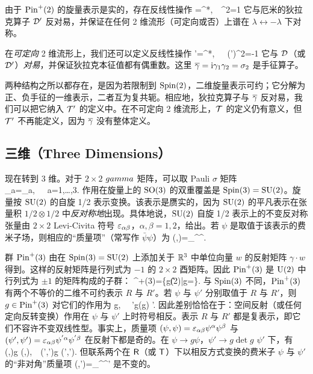由于 ${\mathrm{Pin}}^+(2)$ 的旋量表示是实的，存在反线性操作
\be\label{wes}\T\psi =\psi^*,~~\T^2=1 \ee
它与厄米的狄拉克算子 ${\mathcal D}'$ 反对易，并保证在任何 2 维流形（可定向或否）上谱在 $\lambda\leftrightarrow -\lambda$ 下对称。

在{\it 可定向} 2 维流形上，我们还可以定义反线性操作
\be\label{res}\T'\psi=\bg \psi^*,~~~(\T')^2=-1 \ee
它与 ${\mathcal D}$（或 ${\mathcal D}'$）{\it 对易}，并保证狄拉克本征值都有偶重数。这里 ${\overline\gamma}={\mathrm i}{\gamma}_1{\gamma}_2=\sigma_2$ 是手征算子。


两种结构之所以都存在，是因为若限制到 ${\mathrm{Spin}}(2)$，二维旋量表示可约；它分解为正、负手征的一维表示，二者互为复共轭。相应地，狄拉克算子与 ${\overline\gamma}$ 反对易，我们可以把它纳入 ${\mathcal T}'$ 的定义中。在不可定向 2 维流形上，${\mathcal T}$ 的定义仍有意义，但 ${\mathcal T}'$ 不再能定义，因为 ${\overline\gamma}$ 没有整体定义。

\subsection{三维（Three Dimensions）}\label{wwod}

现在转到 3 维。对于 $2\times 2$ $\\gamma$ 矩阵，可以取 Pauli $\sigma$ 矩阵
\be\label{zob} \g_a=\sigma_a,~~~a=1,\dots,3.\ee
作用在旋量上的 ${\mathrm{SO}}(3)$ 的双重覆盖是 ${\mathrm{Spin}}(3)={\mathrm{SU}}(2)$。旋量按 ${\mathrm{SU}}(2)$ 的自旋 1/2 表示变换。该表示是赝实的，因为 ${\mathrm{SU}}(2)$ 的平凡表示在张量积 $1/2\otimes 1/2$ 中{\it 反对称地}出现。具体地说，${\mathrm{SU}}(2)$ 自旋 1/2 表示上的不变反对称张量由 $2\times 2$ Levi-Civita 符号 $\varepsilon_{\alpha \beta}$，$\alpha,\beta=1,2$，给出。若 $\psi$ 是取值于该表示的费米子场，则相应的“质量项”（常写作 $\bar\psi\psi$）为
\be\label{mast}(\psi,\psi)=\veps_{\alpha\beta}\psi^\alpha\psi^\beta. \ee

群 ${\mathrm{Pin}}^+(3)$ 由在 ${\mathrm{Spin}}(3)={\mathrm{SU}}(2)$ 上添加关于 ${\mathbb{R}}^3$ 中单位向量 $w$ 的反射矩阵 $\gamma\cdot w$ 得到。这样的反射矩阵是行列式为 $-1$ 的 $2\times 2$ 酉矩阵。因此 ${\mathrm{Pin}}^+(3)$ 是 ${\mathrm U}(2)$ 中行列式为 $\pm 1$ 的矩阵构成的子群：
\be\label{pinthree}\Pin^+(3)=\{g\in \U(2)|\det g=\}. \ee
与 ${\mathrm{Spin}}(3)$ 不同，${\mathrm{Pin}}^+(3)$ 有两个不等价的二维不可约表示 $R$ 与 $R'$。若 $\psi$ 与 $\psi'$ 分别取值于 $R$ 与 $R'$，则 $g\in {\mathrm{Pin}}^+(3)$ 对它们的作用为
\be\label{inth}\psi \to g\psi,~~  \psi'\to g(\det g)\,\,\psi'. \ee
因此差别恰恰在于：空间反射（或任何定向反转变换）作用在 $\psi$ 与 $\psi'$ 上时符号相反。表示 $R$ 与 $R'$ 都是复表示，即它们不容许不变双线性型。事实上，质量项 $(\psi,\psi)=\varepsilon_{\alpha\beta}\psi^\alpha\psi^\beta$ 与 $(\psi',\psi')=\varepsilon_{\alpha\beta}\psi^{'\alpha}\psi^{'\beta}$ 在反射下都是奇的。在 $\psi\to g\psi$，$\psi'\to g\det g\,\,\psi'$ 下，有
\be\label{zomb}(\psi,\psi)\to \det g\,\,(\psi,\psi),~~(\psi',\psi')\to \det g\,\,(\psi',\psi'). \ee
但联系两个在 ${\sf R}$（或 ${\sf T}$）下以相反方式变换的费米子 $\psi$ 与 $\psi'$ 的“非对角”质量项
\be\label{minth} (\psi,\psi')=\veps_{\alpha\beta}\psi^\alpha\psi^{'\beta} \ee
是不变的。

